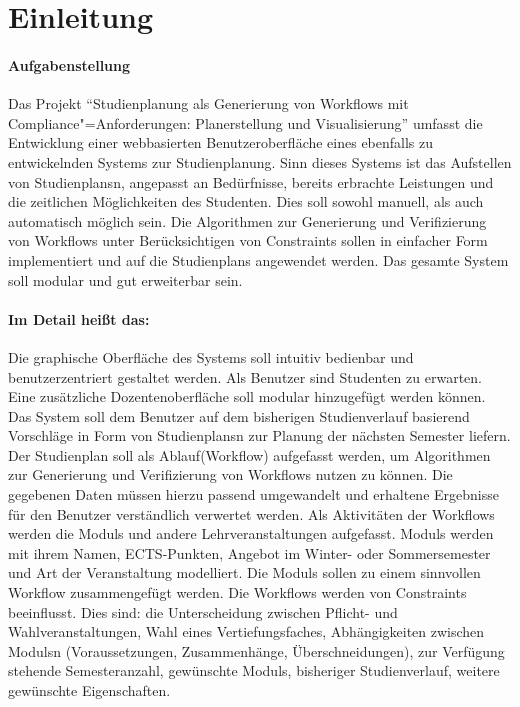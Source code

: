 \section{Einleitung}
\paragraph{Aufgabenstellung}
Das Projekt \enquote{Studienplanung als Generierung von Workflows mit Compliance"=Anforderungen: Planerstellung und Visualisierung} umfasst die Entwicklung einer webbasierten Benutzeroberfläche eines ebenfalls zu entwickelnden Systems zur Studienplanung. Sinn dieses Systems ist das Aufstellen von \glspl{Studienplan}n, angepasst an Bedürfnisse, bereits erbrachte Leistungen und die zeitlichen Möglichkeiten des Studenten. Dies soll sowohl manuell, als auch automatisch möglich sein. Die Algorithmen zur \gls{Generierung} und \gls{Verifizierung} von Workflows unter Berücksichtigen von \glspl{Constraint} sollen in einfacher Form implementiert und auf die \glspl{Studienplan} angewendet werden. Das gesamte System soll \gls{modular} und gut erweiterbar sein.\\
\paragraph{Im Detail heißt das:}
Die graphische Oberfläche des Systems soll intuitiv bedienbar und benutzerzentriert gestaltet werden. Als \gls{Benutzer} sind Studenten zu erwarten. Eine zusätzliche Dozentenoberfläche soll \gls{modular} hinzugefügt werden können. Das System soll dem \gls{Benutzer} auf dem bisherigen Studienverlauf basierend Vorschläge in Form von \glspl{Studienplan}n zur Planung der nächsten Semester liefern. Der \gls{Studienplan} soll als Ablauf(Workflow) aufgefasst werden, um Algorithmen zur \gls{Generierung} und \gls{Verifizierung} von Workflows nutzen zu können. Die gegebenen Daten müssen hierzu passend umgewandelt und erhaltene Ergebnisse für den \gls{Benutzer} verständlich verwertet werden. Als Aktivitäten der Workflows werden die \glspl{Modul} und andere Lehrveranstaltungen aufgefasst. \glspl{Modul} werden mit ihrem Namen, \gls{ECTS-Punkte}n, Angebot im Winter- oder Sommersemester und Art der Veranstaltung modelliert. Die \glspl{Modul} sollen zu einem sinnvollen Workflow zusammengefügt werden. Die Workflows werden von \glspl{Constraint} beeinflusst. Dies sind: die Unterscheidung zwischen Pflicht- und Wahlveranstaltungen, Wahl eines Vertiefungsfaches, Abhängigkeiten zwischen \glspl{Modul}n (Voraussetzungen, Zusammenhänge, Überschneidungen), zur Verfügung stehende Semesteranzahl, gewünschte \glspl{Modul}, bisheriger Studienverlauf, weitere gewünschte Eigenschaften.\\